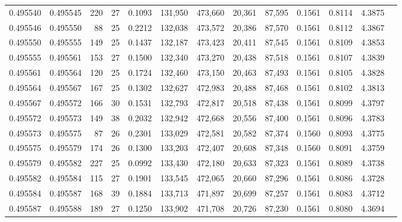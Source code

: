 \begin{tabular}{rrrrrrrrrrrrr}
0.495540 & 0.495545 & 220 &  27 &                                     0.1093 & 131,950 & 473,660 &  20,361 &  87,595 & 0.1561 & 0.8114 & 4.3875 \\
0.495546 & 0.495550 &  88 &  25 &                                     0.2212 & 132,038 & 473,572 &  20,386 &  87,570 & 0.1561 & 0.8112 & 4.3867 \\
0.495550 & 0.495555 & 149 &  25 &                                     0.1437 & 132,187 & 473,423 &  20,411 &  87,545 & 0.1561 & 0.8109 & 4.3853 \\
0.495555 & 0.495561 & 153 &  27 &                                     0.1500 & 132,340 & 473,270 &  20,438 &  87,518 & 0.1561 & 0.8107 & 4.3839 \\
0.495561 & 0.495564 & 120 &  25 &                                     0.1724 & 132,460 & 473,150 &  20,463 &  87,493 & 0.1561 & 0.8105 & 4.3828 \\
0.495564 & 0.495567 & 167 &  25 &                                     0.1302 & 132,627 & 472,983 &  20,488 &  87,468 & 0.1561 & 0.8102 & 4.3813 \\
0.495567 & 0.495572 & 166 &  30 &                                     0.1531 & 132,793 & 472,817 &  20,518 &  87,438 & 0.1561 & 0.8099 & 4.3797 \\
0.495572 & 0.495573 & 149 &  38 &                                     0.2032 & 132,942 & 472,668 &  20,556 &  87,400 & 0.1561 & 0.8096 & 4.3783 \\
0.495573 & 0.495575 &  87 &  26 &                                     0.2301 & 133,029 & 472,581 &  20,582 &  87,374 & 0.1560 & 0.8093 & 4.3775 \\
0.495575 & 0.495579 & 174 &  26 &                                     0.1300 & 133,203 & 472,407 &  20,608 &  87,348 & 0.1560 & 0.8091 & 4.3759 \\
0.495579 & 0.495582 & 227 &  25 &                                     0.0992 & 133,430 & 472,180 &  20,633 &  87,323 & 0.1561 & 0.8089 & 4.3738 \\
0.495582 & 0.495584 & 115 &  27 &                                     0.1901 & 133,545 & 472,065 &  20,660 &  87,296 & 0.1561 & 0.8086 & 4.3728 \\
0.495584 & 0.495587 & 168 &  39 &                                     0.1884 & 133,713 & 471,897 &  20,699 &  87,257 & 0.1561 & 0.8083 & 4.3712 \\
0.495587 & 0.495588 & 189 &  27 &                                     0.1250 & 133,902 & 471,708 &  20,726 &  87,230 & 0.1561 & 0.8080 & 4.3694 \\

\end{tabular}
